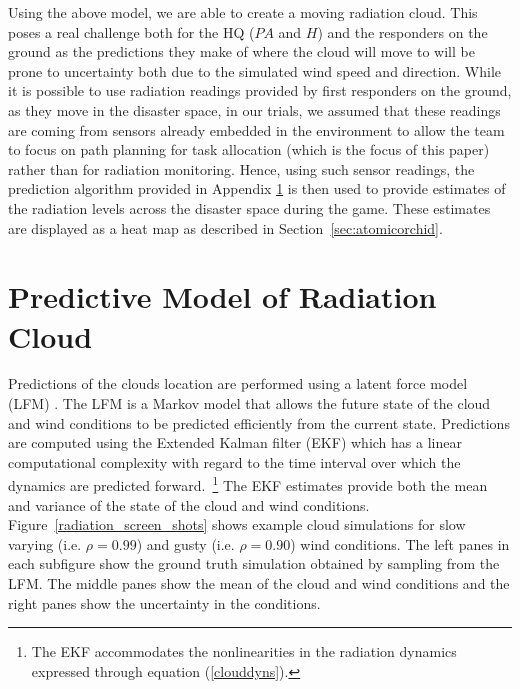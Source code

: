 Using the above model, we are able to create a moving radiation cloud. This poses a real challenge both for the HQ ($PA$ and $H$) and the responders on the ground as the predictions they make of where the cloud will move to will be prone to uncertainty both due to the simulated wind speed and direction.  While it is possible to use radiation readings provided by first responders on the ground, as they move in the disaster space, in our trials, we assumed that these readings are coming from sensors already embedded in the environment to allow the team to focus on path planning for task allocation (which is the focus of this paper) rather than for radiation monitoring. Hence, using such sensor readings, the prediction algorithm provided in Appendix \ref{sec:appendix} is then used to provide estimates of the radiation levels across  the disaster space during the game. These estimates are displayed as a heat map as described in Section~\ref{sec:atomicorchid}.

\section{Predictive Model of Radiation Cloud}\label{sec:appendix}

Predictions of the clouds location are performed using a latent force model (LFM) \cite{reece10,reece14}.  The LFM is a Markov model that allows the future state of the cloud and wind conditions to be predicted efficiently from the current state.  Predictions are computed using the Extended Kalman filter (EKF) which has a linear computational complexity with regard to the time interval over which the dynamics are predicted forward.~\footnote{The EKF accommodates the nonlinearities in the radiation dynamics expressed through equation (\ref{clouddyns}).}  The EKF estimates provide both the mean and variance of the state of the cloud and wind conditions.  Figure~\ref{radiation_screen_shots} shows example cloud simulations for slow varying (i.e. $\rho=0.99$) and gusty (i.e. $\rho=0.90$) wind conditions.  The left panes in each subfigure show the ground truth simulation obtained by sampling from the LFM.  The middle panes show the mean of the cloud and wind conditions and the right panes show the uncertainty in the conditions.

